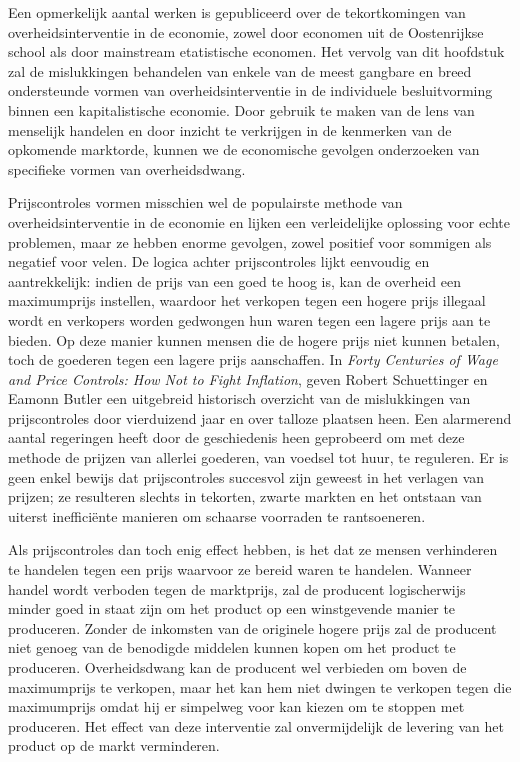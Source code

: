 Een opmerkelijk aantal werken is gepubliceerd over de tekortkomingen van overheidsinterventie in de economie, zowel door economen uit de Oostenrijkse school als door mainstream etatistische economen.\autocite{182} Het vervolg van dit hoofdstuk zal de mislukkingen behandelen van enkele van de meest gangbare en breed ondersteunde vormen van overheidsinterventie in de individuele besluitvorming binnen een kapitalistische economie. Door gebruik te maken van de lens van menselijk handelen en door inzicht te verkrijgen in de kenmerken van de opkomende marktorde, kunnen we de economische gevolgen onderzoeken van specifieke vormen van overheidsdwang.

Prijscontroles vormen misschien wel de populairste methode van overheidsinterventie in de economie en lijken een verleidelijke oplossing voor echte problemen, maar ze hebben enorme gevolgen, zowel positief voor sommigen als negatief voor velen. De logica achter prijscontroles lijkt eenvoudig en aantrekkelijk: indien de prijs van een goed te hoog is, kan de overheid een maximumprijs instellen, waardoor het verkopen tegen een hogere prijs illegaal wordt en verkopers worden gedwongen hun waren tegen een lagere prijs aan te bieden. Op deze manier kunnen mensen die de hogere prijs niet kunnen betalen, toch de goederen tegen een lagere prijs aanschaffen. In \emph{Forty Centuries of Wage and Price Controls: How Not to Fight Inflation}, geven Robert Schuettinger en Eamonn Butler een uitgebreid historisch overzicht van de mislukkingen van prijscontroles door vierduizend jaar en over talloze plaatsen heen. Een alarmerend aantal regeringen heeft door de geschiedenis heen geprobeerd om met deze methode de prijzen van allerlei goederen, van voedsel tot huur, te reguleren. Er is geen enkel bewijs dat prijscontroles succesvol zijn geweest in het verlagen van prijzen; ze resulteren slechts in tekorten, zwarte markten en het ontstaan van uiterst inefficiënte manieren om schaarse voorraden te rantsoeneren.

Als prijscontroles dan toch enig effect hebben, is het dat ze mensen verhinderen te handelen tegen een prijs waarvoor ze bereid waren te handelen. Wanneer handel wordt verboden tegen de marktprijs, zal de producent logischerwijs minder goed in staat zijn om het product op een winstgevende manier te produceren. Zonder de inkomsten van de originele hogere prijs zal de producent niet genoeg van de benodigde middelen kunnen kopen om het product te produceren. Overheidsdwang kan de producent wel verbieden om boven de maximumprijs te verkopen, maar het kan hem niet dwingen te verkopen tegen die maximumprijs omdat hij er simpelweg voor kan kiezen om te stoppen met produceren. Het effect van deze interventie zal onvermijdelijk de levering van het product op de markt verminderen.

